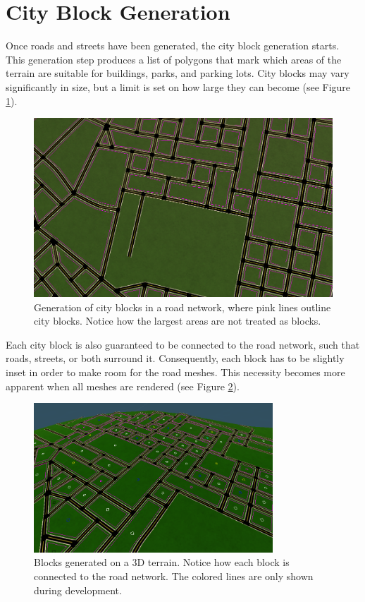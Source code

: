 \section{City Block Generation}

Once roads and streets have been generated, the city block generation starts.
This generation step produces a list of polygons that mark which areas of the terrain are suitable for buildings, parks, and parking lots.
City blocks may vary significantly in size, but a limit is set on how large they can become (see Figure \ref{fig:results_blockgen1}).

\begin{figure}[H]
  \centering

  \includegraphics[width=\textwidth]{figure/results/blockgen1.png}
  \caption{Generation of city blocks in a road network, where pink lines outline city blocks. Notice how the largest areas are not treated as blocks.}

  \label{fig:results_blockgen1}
\end{figure}

Each city block is also guaranteed to be connected to the road network, such that roads, streets, or both surround it.
Consequently, each block has to be slightly inset in order to make room for the road meshes.
This necessity becomes more apparent when all meshes are rendered (see Figure \ref{fig:results_blockgen2}).

\begin{figure}[H]
  \centering

  \includegraphics[width=0.8\textwidth]{figure/results/blockgen2.png}
  \caption{Blocks generated on a 3D terrain. Notice how each block is connected to the road network. The colored lines are only shown during development.}

  \label{fig:results_blockgen2}
\end{figure}

